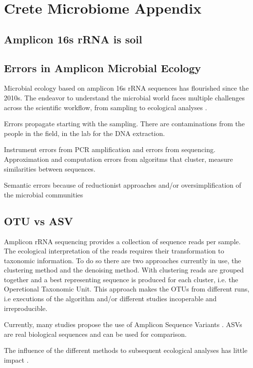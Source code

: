 
\chapter{Crete Microbiome Appendix} %

\label{AppendixC} 

\section{Amplicon 16s rRNA is soil}

\section{Errors in Amplicon Microbial Ecology}

Microbial ecology based on amplicon 16s rRNA sequences has flourished since the
2010s. The endeavor to understand the microbial world faces multiple challenges
across the scientific workflow, from sampling to ecological analyses \citep{Lee2012}.

Errors propagate starting with the sampling. There are contaminations from the
people in the field, in the lab for the DNA extraction. 

Instrument errors from PCR amplification and errors from sequencing.
Approximation and computation errors from algoritms that cluster, measure similarities between
sequences.

Semantic errors because of reductionist approaches and/or oversimplification
of the microbial communities

\section{OTU vs ASV}

Amplicon rRNA sequencing provides a collection of sequence reads per sample. 
The ecological interpretation of the reads requires their transformation to
taxonomic information. To do so there are two approaches currently in use, 
the clustering method and the denoising method. With clustering reads are 
grouped together and a best representing sequence is produced for each 
cluster, i.e. the Operetional Taxonomic Unit. This approach makes the OTUs 
from different runs, i.e executions of the algorithm and/or different studies
incoperable and irreproducible.

Currently, many studies propose the use of Amplicon Sequence Variants \citep{Callahan2017}. 
ASVs are real biological sequences and can be used for comparison.

The influence of the different methods to subsequent ecological analyses has
little impact \citep{Glassman2018}.

